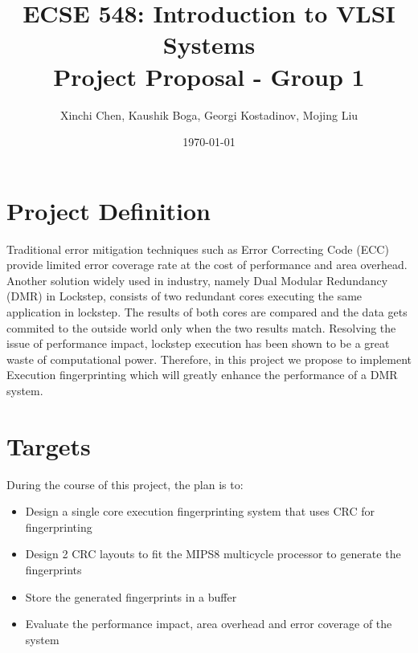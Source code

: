 \documentclass[dvips,12pt]{article}
\begin{document}
\title{ECSE 548: Introduction to VLSI Systems\protect\\Project Proposal - Group 1}

\author{Xinchi Chen, Kaushik Boga, Georgi Kostadinov, Mojing Liu}
\date{\today}



\maketitle


\section{Project Definition}


Traditional error mitigation techniques such as Error Correcting Code (ECC)
provide limited error coverage rate at the cost of performance and area overhead. Another solution widely used in
industry, namely Dual Modular Redundancy (DMR) in Lockstep, consists of two redundant cores executing the same application
in lockstep. The results of both cores are compared and the data gets commited to the outside world only when the two results match. 
Resolving the issue of performance impact, lockstep execution has been shown to be a great waste of computational
power. Therefore, in this project we propose to implement Execution fingerprinting which will greatly enhance the performance
of a DMR system.


\section{Targets}

During the course of this project, the plan is to:
\begin{itemize}
\item Design a single core execution fingerprinting system that uses CRC for fingerprinting
\item Design 2 CRC layouts to fit the MIPS8 multicycle processor to generate the fingerprints
\item Store the generated fingerprints in a buffer
\item Evaluate the performance impact, area overhead and error coverage of the system
\end{itemize}
\end{document}
